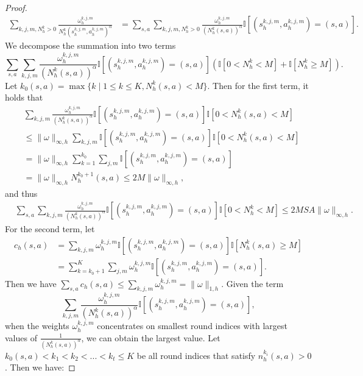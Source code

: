 \documentclass{article}
\begin{document}
\begin{proof}
\begin{align*}
        \sum_{k,j,m,N_h^k >0}\frac{\omega_{h}^{k, j, m}}{N_h^k(s_h^{k,j,m},a_h^{k,j,m})^{\alpha}}&= \sum_{s,a}\sum_{k,j,m,N_h^k >0}\frac{\omega_{h}^{k, j, m}}{(N_h^k(s,a))^{\alpha}}\mathbb{I}[(s_h^{k,j,m},a_h^{k,j,m}) = (s,a)].
\end{align*} 
We decompose the summation into two terms
$$\sum_{s,a}\sum_{k, j, m}\frac{\omega_{h}^{k, j, m}}{(N_h^k(s,a))^{\alpha}}\mathbb{I}[(s_h^{k,j,m},a_h^{k,j,m}) = (s,a)] \left( \mathbb{I}\left[ 0<N_h^k< M\right] + \mathbb{I}\left[ N_h^k\geq M\right]\right).$$
Let  $k_0(s,a) = \max \{k \mid 1 \leq k\leq K, N_h^k(s,a) < M\}$. Then for the first term, it holds that
\begin{align}
\label{smallnsum}
&\sum_{k, j, m}\frac{\omega_{h}^{k, j, m}}{(N_h^k(s,a))^{\alpha}}\mathbb{I}[(s_h^{k,j,m},a_h^{k,j,m}) = (s,a)]  \mathbb{I}\left[ 0<N_h^k(s,a)< M\right] \nonumber\\
&\leq \|\omega\|_{\infty,h}\sum_{k, j, m}\mathbb{I}[(s_h^{k,j,m},a_h^{k,j,m}) = (s,a)]  \mathbb{I}\left[ 0<N_h^k(s,a)< M\right] \nonumber\\
& = \|\omega\|_{\infty,h}\sum_{k=1}^{k_0}\sum_{j,m}\mathbb{I}[(s_h^{k,j,m},a_h^{k,j,m}) = (s,a)] \nonumber\\
&= \|\omega\|_{\infty,h}N_h^{k_0+1}(s,a) \leq 2M\|\omega\|_{\infty,h},
\end{align}
and thus
\begin{align}
\label{smallnsumsa}
&\sum_{s,a}\sum_{k, j, m}\frac{\omega_{h}^{k, j, m}}{(N_h^k(s,a))^{\alpha}}\mathbb{I}[(s_h^{k,j,m},a_h^{k,j,m}) = (s,a)]  \mathbb{I}\left[ 0<N_h^k< M\right]  \leq 2MSA\|\omega\|_{\infty,h}.
\end{align}
For the second term, let 
\begin{align*}
    c_h(s,a) &=\sum_{k, j, m}\omega_{h}^{k, j, m}\mathbb{I}[(s_h^{k,j,m},a_h^{k,j,m}) = (s,a)]\mathbb{I}\left[ N_h^k(s,a)\geq M\right] \\
    &= \sum_{k=k_0+1}^K\sum_{j, m}\omega_{h}^{k, j, m}\mathbb{I}[(s_h^{k,j,m},a_h^{k,j,m}) = (s,a)].
\end{align*}
Then we have $\sum_{s,a} c_h(s,a) \leq \sum_{k,j,m}\omega_{h}^{k, j, m} = \|\omega\|_{1,h}$. Given the term 
$$\sum_{k, j, m}\frac{\omega_{h}^{k, j, m}}{(N_h^k(s,a))^{\alpha}}\mathbb{I}[(s_h^{k,j,m},a_h^{k,j,m}) = (s,a)],$$ when the weights $\omega_{h}^{k, j, m}$ concentrates on smallest round indices with largest values of \(\frac{1}{(N_h^k(s,a))^{\alpha}} \), we can obtain the largest value. Let $k_0(s,a) < k_1 < k_2 <...<k_t \leq K$ be all round indices that satisfy $n_h^{k_i}(s,a) >0$. Then we have:

\end{proof}
\end{document}
